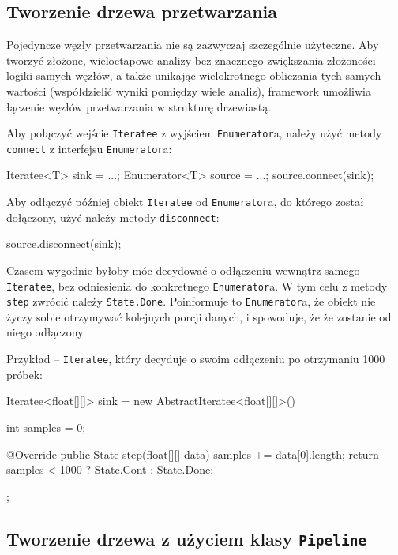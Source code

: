 \subsection{Tworzenie drzewa przetwarzania}

Pojedyncze węzły przetwarzania nie są zazwyczaj szczególnie użyteczne. Aby tworzyć złożone,
wieloetapowe analizy bez znacznego zwiększania złożoności logiki samych węzłów, a także unikając
wielokrotnego obliczania tych samych wartości (współdzielić wyniki pomiędzy wiele analiz), framework
umożliwia łączenie węzłów przetwarzania w strukturę drzewiastą.

Aby połączyć wejście \texttt{Iteratee} z wyjściem \texttt{Enumerator}a, należy użyć metody
\texttt{connect} z interfejsu \texttt{Enumerator}a:

\begin{java}
Iteratee<T> sink = ...;
Enumerator<T> source = ...;
source.connect(sink);
\end{java}

Aby odłączyć później obiekt \texttt{Iteratee} od \texttt{Enumerator}a, do którego został dołączony,
użyć należy metody \texttt{disconnect}:

\begin{java}
source.disconnect(sink);
\end{java}

Czasem wygodnie byłoby móc decydować o odłączeniu wewnątrz samego \texttt{Iteratee}, bez odniesienia
do konkretnego \texttt{Enumerator}a. W tym celu z metody \texttt{step} zwrócić należy
\texttt{State.Done}. Poinformuje to \texttt{Enumerator}a, że obiekt nie życzy sobie otrzymywać
kolejnych porcji danych, i spowoduje, że że zostanie od niego odłączony.

Przykład -- \texttt{Iteratee}, który decyduje o swoim odłączeniu po otrzymaniu 1000 próbek:

\begin{java}
Iteratee<float[][]> sink = new AbstractIteratee<float[][]>() {

    int samples = 0;

    @Override
    public State step(float[][] data) {
        samples += data[0].length;
        return samples < 1000 ? State.Cont : State.Done;
    }
};
\end{java}


\subsection{Tworzenie drzewa z użyciem klasy \texttt{Pipeline}}

